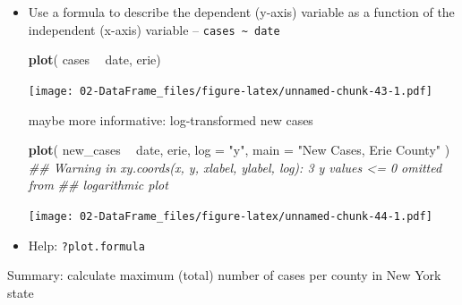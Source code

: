 \documentclass[]{book}
\newenvironment{Shaded}{\begin{snugshade}}{\end{snugshade}}
\newcommand{\CommentTok}[1]{\textcolor[rgb]{0.56,0.35,0.01}{\textit{#1}}}
\newcommand{\DataTypeTok}[1]{\textcolor[rgb]{0.13,0.29,0.53}{#1}}
\newcommand{\KeywordTok}[1]{\textcolor[rgb]{0.13,0.29,0.53}{\textbf{#1}}}
\newcommand{\NormalTok}[1]{#1}
\newcommand{\OperatorTok}[1]{\textcolor[rgb]{0.81,0.36,0.00}{\textbf{#1}}}
\newcommand{\StringTok}[1]{\textcolor[rgb]{0.31,0.60,0.02}{#1}}
\begin{document}
\begin{itemize}
\item
  Use a formula to describe the dependent (y-axis) variable as a function of the independent (x-axis) variable -- \texttt{cases\ \textasciitilde{}\ date}

\begin{Shaded}
\begin{Highlighting}[]
\KeywordTok{plot}\NormalTok{( cases }\OperatorTok{~}\StringTok{ }\NormalTok{date, erie)}
\end{Highlighting}
\end{Shaded}

  \texttt{[image: 02-DataFrame\_files/figure-latex/unnamed-chunk-43-1.pdf]}

  maybe more informative: log-transformed new cases

\begin{Shaded}
\begin{Highlighting}[]
\KeywordTok{plot}\NormalTok{( new_cases }\OperatorTok{~}\StringTok{ }\NormalTok{date, erie, }\DataTypeTok{log =} \StringTok{"y"}\NormalTok{, }\DataTypeTok{main =} \StringTok{"New Cases, Erie County"}\NormalTok{ )}
\CommentTok{## Warning in xy.coords(x, y, xlabel, ylabel, log): 3 y values <= 0 omitted from}
\CommentTok{## logarithmic plot}
\end{Highlighting}
\end{Shaded}

  \texttt{[image: 02-DataFrame\_files/figure-latex/unnamed-chunk-44-1.pdf]}
\item
  Help: \texttt{?plot.formula}
\end{itemize}

Summary: calculate maximum (total) number of cases per county in New York state
\end{document}
